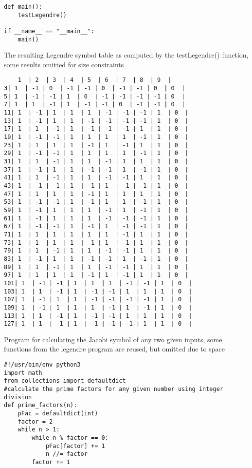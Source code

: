 \documentclass[12pt]{article}
\begin{document}
\begin{enumerate}
\begin{lstlisting}
def main():
    testLegendre() 

if __name__ == "__main__":
    main()
    \end{lstlisting}

    The resulting Legendre symbol table as computed by the testLegendre() function, some results omitted for size constraints
    \begin{lstlisting}
    1  | 2  | 3  | 4  | 5  | 6  | 7  | 8  | 9  | 
3| 1  | -1 | 0  | -1 | -1 | 0  | -1 | -1 | 0  | 0  | 
5| 1  | -1 | -1 | 1  | 0  | -1 | -1 | -1 | -1 | 0  | 
7| 1  | 1  | -1 | 1  | -1 | -1 | 0  | -1 | -1 | 0  | 
11| 1  | -1 | 1  | 1  | 1  | -1 | -1 | -1 | 1  | 0  | 
13| 1  | -1 | 1  | 1  | -1 | -1 | -1 | -1 | 1  | 0  | 
17| 1  | 1  | -1 | 1  | -1 | -1 | -1 | 1  | 1  | 0  | 
19| 1  | -1 | -1 | 1  | 1  | 1  | 1  | -1 | 1  | 0  | 
23| 1  | 1  | 1  | 1  | -1 | 1  | -1 | 1  | 1  | 0  | 
29| 1  | -1 | -1 | 1  | 1  | 1  | 1  | -1 | 1  | 0  | 
31| 1  | 1  | -1 | 1  | 1  | -1 | 1  | 1  | 1  | 0  | 
37| 1  | -1 | 1  | 1  | -1 | -1 | 1  | -1 | 1  | 0  | 
41| 1  | 1  | -1 | 1  | 1  | -1 | -1 | 1  | 1  | 0  | 
43| 1  | -1 | -1 | 1  | -1 | 1  | -1 | -1 | 1  | 0  | 
47| 1  | 1  | 1  | 1  | -1 | 1  | 1  | 1  | 1  | 0  | 
53| 1  | -1 | -1 | 1  | -1 | 1  | 1  | -1 | 1  | 0  | 
59| 1  | -1 | 1  | 1  | 1  | -1 | 1  | -1 | 1  | 0  | 
61| 1  | -1 | 1  | 1  | 1  | -1 | -1 | -1 | 1  | 0  | 
67| 1  | -1 | -1 | 1  | -1 | 1  | -1 | -1 | 1  | 0  | 
71| 1  | 1  | 1  | 1  | 1  | 1  | -1 | 1  | 1  | 0  | 
73| 1  | 1  | 1  | 1  | -1 | 1  | -1 | 1  | 1  | 0  | 
79| 1  | 1  | -1 | 1  | 1  | -1 | -1 | 1  | 1  | 0  | 
83| 1  | -1 | 1  | 1  | -1 | -1 | 1  | -1 | 1  | 0  | 
89| 1  | 1  | -1 | 1  | 1  | -1 | -1 | 1  | 1  | 0  | 
97| 1  | 1  | 1  | 1  | -1 | 1  | -1 | 1  | 1  | 0  | 
101| 1  | -1 | -1 | 1  | 1  | 1  | -1 | -1 | 1  | 0  | 
103| 1  | 1  | -1 | 1  | -1 | -1 | 1  | 1  | 1  | 0  | 
107| 1  | -1 | 1  | 1  | -1 | -1 | -1 | -1 | 1  | 0  | 
109| 1  | -1 | 1  | 1  | 1  | -1 | 1  | -1 | 1  | 0  | 
113| 1  | 1  | -1 | 1  | -1 | -1 | 1  | 1  | 1  | 0  | 
127| 1  | 1  | -1 | 1  | -1 | -1 | -1 | 1  | 1  | 0  | 
    \end{lstlisting}
    
    Program for calculating the Jacobi symbol of any two given inputs, some functions from the legendre program are reused, but omitted due to space
    \begin{lstlisting}
#!/usr/bin/env python3
import math
from collections import defaultdict
#calculate the prime factors for any given number using integer division
def prime_factors(n):
    pFac = defaultdict(int)
    factor = 2
    while n > 1:
        while n % factor == 0:
            pFac[factor] += 1
            n //= factor
        factor += 1


\end{lstlisting}
\end{enumerate}
\end{document}
